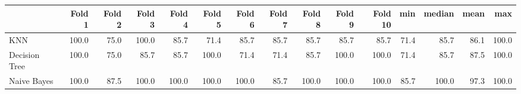 \begin{tabular}{lrrrrrrrrrrrrrr}
\toprule
{} & Fold 1 & Fold 2 & Fold 3 & Fold 4 & Fold 5 & Fold 6 & Fold 7 & Fold 8 & Fold 9 & Fold 10 &   min & median &  mean &    max \\
\midrule
KNN           & 100.0 & 75.0 & 100.0 & 85.7 & 71.4 & 85.7 & 85.7 & 85.7 & 85.7 & 85.7 & 71.4 & 85.7 & 86.1 & 100.0 \\
Decision Tree & 100.0 & 75.0 & 85.7 & 85.7 & 100.0 & 71.4 & 71.4 & 85.7 & 100.0 & 100.0 & 71.4 & 85.7 & 87.5 & 100.0 \\
Naive Bayes   & 100.0 & 87.5 & 100.0 & 100.0 & 100.0 & 100.0 & 85.7 & 100.0 & 100.0 & 100.0 & 85.7 & 100.0 & 97.3 & 100.0 \\
\bottomrule
\end{tabular}


